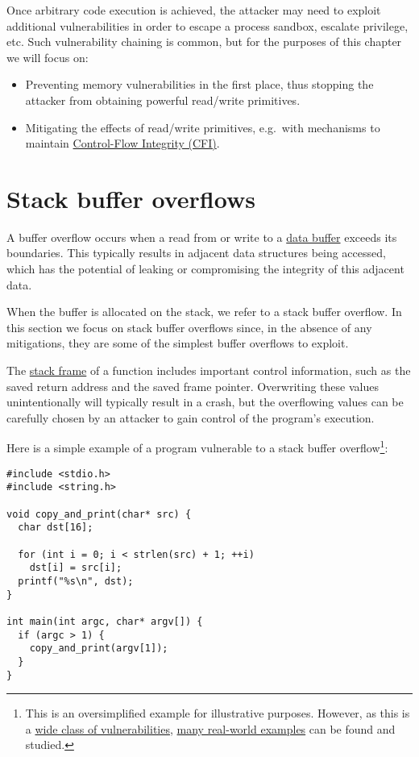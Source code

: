 \documentclass[
  a4paper,
]{report}
\providecommand{\tightlist}{%
  \setlength{\itemsep}{0pt}\setlength{\parskip}{0pt}}
\begin{document}
Once arbitrary code execution is achieved, the attacker may need to
exploit additional vulnerabilities in order to escape a process sandbox,
escalate privilege, etc. Such vulnerability chaining is common, but for
the purposes of this chapter we will focus on:

\begin{itemize}
\tightlist
\item
  Preventing memory vulnerabilities in the first place, thus stopping
  the attacker from obtaining powerful read/write primitives.
\item
  Mitigating the effects of read/write primitives, e.g.~with mechanisms
  to maintain \protect\hyperlink{cfi}{Control-Flow Integrity (CFI)}.
\end{itemize}

\hypertarget{stack-buffer-overflows}{%
\section{Stack buffer overflows}\label{stack-buffer-overflows}}

A buffer overflow occurs when a read from or write to a
\href{https://en.wikipedia.org/wiki/Data_buffer}{data buffer} exceeds
its boundaries. This typically results in adjacent data structures being
accessed, which has the potential of leaking or compromising the
integrity of this adjacent data.

When the buffer is allocated on the stack, we refer to a stack buffer
overflow. In this section we focus on stack buffer overflows since, in
the absence of any mitigations, they are some of the simplest buffer
overflows to exploit.

The \href{https://en.wikipedia.org/wiki/Call_stack}{stack frame} of a
function includes important control information, such as the saved
return address and the saved frame pointer. Overwriting these values
unintentionally will typically result in a crash, but the overflowing
values can be carefully chosen by an attacker to gain control of the
program's execution.

Here is a simple example of a program vulnerable to a stack buffer
overflow\footnote{This is an oversimplified example for illustrative
  purposes. However, as this is a
  \href{https://cwe.mitre.org/data/definitions/121.html}{wide class of
  vulnerabilities},
  \href{https://www.cvedetails.com/vulnerability-list/cweid-121/vulnerabilities.html}{many
  real-world examples} can be found and studied.}:

\begin{verbatim}
#include <stdio.h>
#include <string.h>

void copy_and_print(char* src) {
  char dst[16];

  for (int i = 0; i < strlen(src) + 1; ++i)
    dst[i] = src[i];
  printf("%s\n", dst);
}

int main(int argc, char* argv[]) {
  if (argc > 1) {
    copy_and_print(argv[1]);
  }
}
\end{verbatim}
\end{document}
